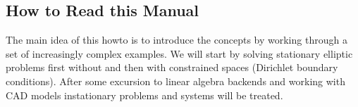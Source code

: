 \subsection{How to Read this Manual}

The main idea of this howto is to introduce the concepts by working
through a set of increasingly complex examples. We will start by 
solving stationary elliptic problems first without and then with constrained spaces
(Dirichlet boundary conditions). After some excursion to linear algebra backends and 
working with CAD models instationary problems and systems will be treated.

\cleardoublepage
